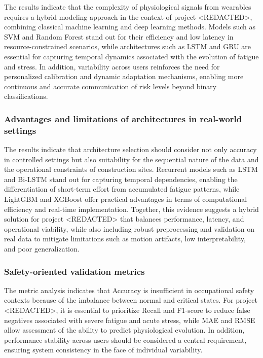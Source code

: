 \documentclass[runningheads]{llncs}
\begin{document}
The results indicate that the complexity of physiological signals from wearables requires a hybrid modeling approach in the context of project <REDACTED>, combining classical machine learning and deep learning methods. Models such as SVM and Random Forest stand out for their efficiency and low latency in resource-constrained scenarios, while architectures such as LSTM and GRU are essential for capturing temporal dynamics associated with the evolution of fatigue and stress. In addition, variability across users reinforces the need for personalized calibration and dynamic adaptation mechanisms, enabling more continuous and accurate communication of risk levels beyond binary classifications.

\subsubsection*{Advantages and limitations of architectures in real-world settings}

The results indicate that architecture selection should consider not only accuracy in controlled settings but also suitability for the sequential nature of the data and the operational constraints of construction sites. Recurrent models such as LSTM and Bi-LSTM stand out for capturing temporal dependencies, enabling the differentiation of short-term effort from accumulated fatigue patterns, while LightGBM and XGBoost offer practical advantages in terms of computational efficiency and real-time implementation. Together, this evidence suggests a hybrid solution for project <REDACTED> that balances performance, latency, and operational viability, while also including robust preprocessing and validation on real data to mitigate limitations such as motion artifacts, low interpretability, and poor generalization.

\subsubsection*{Safety-oriented validation metrics}

The metric analysis indicates that Accuracy is insufficient in occupational safety contexts because of the imbalance between normal and critical states. For project <REDACTED>, it is essential to prioritize Recall and F1-score to reduce false negatives associated with severe fatigue and acute stress, while MAE and RMSE allow assessment of the ability to predict physiological evolution. In addition, performance stability across users should be considered a central requirement, ensuring system consistency in the face of individual variability.
\end{document}
